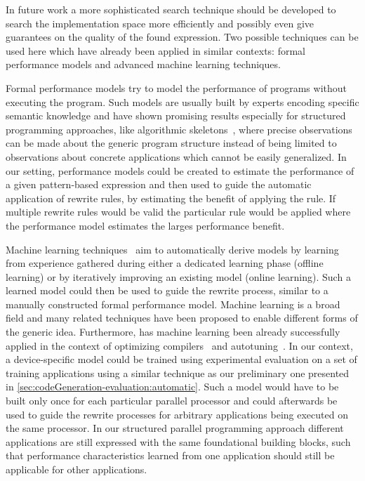 In future work a more sophisticated search technique should be developed to search the implementation space more efficiently and possibly even give guarantees on the quality of the found expression.
Two possible techniques can be used here which have already been applied in similar contexts:
formal performance models and advanced machine learning techniques.

Formal performance models try to model the performance of programs without executing the program.
Such models are usually built by experts encoding specific semantic knowledge and have shown promising results especially for structured programming approaches, like algorithmic skeletons~\cite{DarlingtonFHKSW93,Alt2007,HayashiC02}, where precise observations can be made about the generic program structure instead of being limited to observations about concrete applications which cannot be easily generalized.
In our setting, performance models could be created to estimate the performance of a given pattern-based expression and then used to guide the automatic application of rewrite rules, by estimating the benefit of applying the rule.
If multiple rewrite rules would be valid the particular rule would be applied where the performance model estimates the larges performance benefit.

Machine learning techniques~\cite{Bishop2007} aim to automatically derive models by learning from experience gathered during either a dedicated learning phase (offline learning) or by iteratively improving an existing model (online learning).
Such a learned model could then be used to guide the rewrite process, similar to a manually constructed formal performance model.
Machine learning is a broad field and many related techniques have been proposed to enable different forms of the generic idea.
Furthermore, has machine learning been already successfully applied in the context of optimizing compilers~\cite{DubachJBFO09} and autotuning~\cite{CollinsFLC13}.
In our context, a device-specific model could be trained using experimental evaluation on a set of training applications using a similar technique as our preliminary one presented in \autoref{sec:codeGeneration-evaluation:automatic}.
Such a model would have to be built only once for each particular parallel processor and could afterwards be used to guide the rewrite processes for arbitrary applications being executed on the same processor.
In our structured parallel programming approach different applications are still expressed with the same foundational building blocks, such that performance characteristics learned from one application should still be applicable for other applications.

